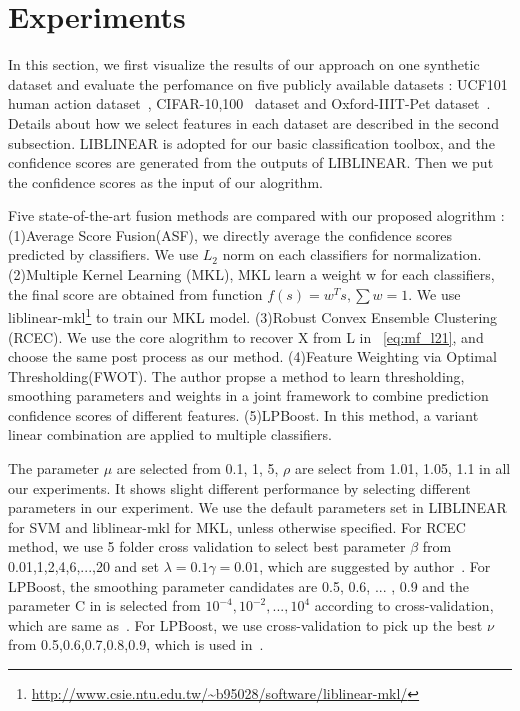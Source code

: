 \documentclass[letterpaper]{article}
\begin{document}
\section{Experiments}

In this section, we first visualize the results of our approach on one synthetic dataset and evaluate the perfomance on five publicly available datasets : UCF101 human action dataset~\cite{soomro2012ucf101}, CIFAR-10,100~\cite{krizhevsky2009learning} dataset and Oxford-IIIT-Pet dataset~\cite{parkhi12a}. 
Details about how we select features in each dataset are described in the second subsection.
LIBLINEAR\cite{fan2008liblinear} is adopted for our basic classification toolbox, and the confidence scores are generated from the outputs of LIBLINEAR. Then we put the confidence scores as the input of our alogrithm.

Five state-of-the-art fusion methods are compared with our proposed alogrithm : (1)Average Score Fusion(ASF), we directly average the confidence scores predicted by classifiers. We use $L_2$ norm on each classifiers for normalization. (2)Multiple Kernel Learning (MKL),  MKL learn a weight w for each classifiers, the final score are obtained from function $f(s)=w^{T}s, \sum w = 1$. We use liblinear-mkl\footnote{\url{http://www.csie.ntu.edu.tw/~b95028/software/liblinear-mkl/}} to train our MKL model. (3)Robust Convex Ensemble Clustering (RCEC)\cite{gaoijcai2016robust}. We use the core alogrithm to recover X from L in ~\ref{eq:mf_l21}, and choose the same post process as our method. (4)Feature Weighting via Optimal Thresholding(FWOT)\cite{xuiccv2013feature}. The author propse a method to learn thresholding, smoothing parameters and weights in a joint framework to combine prediction confidence scores of different features. (5)LPBoost\cite{gehler2009feature}. In this method, a variant linear combination are applied to multiple classifiers.

The parameter $\mu$ are selected from {0.1, 1, 5}, $\rho$ are select from {1.01, 1.05, 1.1} in all our experiments. It shows slight different performance by selecting different parameters in our experiment. We use the default parameters set in LIBLINEAR for SVM and liblinear-mkl for MKL, unless otherwise specified. For RCEC method, we use 5 folder cross validation to select best parameter $\beta$ from {0.01,1,2,4,6,...,20} and set $\lambda = 0.1 \gamma = 0.01$, which are suggested by author~\cite{yiicdm2012robust}. For LPBoost, the smoothing parameter candidates are {0.5, 0.6, ... , 0.9} and the parameter C in is selected from $10^{-4},10^{-2},...,10^{4}$ according to cross-validation, which are same as~\cite{xuiccv2013feature}. For LPBoost, we use cross-validation to pick up the best $\nu$ from {0.5,0.6,0.7,0.8,0.9}, which is used in~\cite{xuiccv2013feature}.
\end{document}
